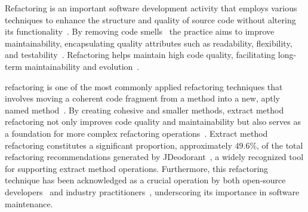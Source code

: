 Refactoring is an important software development activity that employs various techniques to enhance the structure and quality of source code without altering its functionality~\cite{Opdyke1992Refactoring, Fowler1999Refactoring}. 
By removing code smells~\cite{Fowler1999Refactoring} the practice aims to improve maintainability, encapsulating quality attributes such as readability, flexibility, and testability~\cite{ieee1990standard, chawla2015sqmma}.
Refactoring helps maintain high code quality, facilitating long-term maintainability and evolution~\cite{moser2007case}. 


\Exm{} refactoring is one of the most commonly applied refactoring techniques that involves moving a coherent code fragment from a method into a new, aptly named method~\cite{Fowler1999Refactoring}.
By creating cohesive and smaller methods, extract method refactoring not only improves code quality and maintainability but also serves as a foundation for more complex refactoring operations~\cite{Zarras2015}. 
Extract method refactoring constitutes a significant proportion, approximately $49.6$\%, of the total refactoring recommendations generated by JDeodorant~\cite{JDeodrant}, a widely recognized tool for supporting extract method operations. Furthermore, this refactoring technique has been acknowledged as a crucial operation by both open-source developers~\cite{silva2016we} and industry practitioners~\cite{van2021data}, underscoring its importance in software maintenance.

